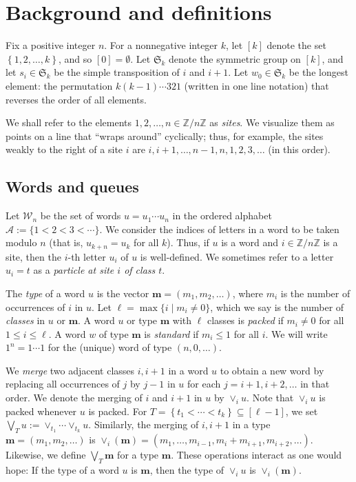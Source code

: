 \documentclass[reqno]{amsart}
\newcommand{\0}{\phantom{c}}
\newcommand{\merge}[1]{\vee_{#1}} %
\newcommand{\SymGp}[1]{\mathfrak{S}_{#1}} %
\newcommand{\mm}{\mathbf{m}}
\newcommand{\mcA}{\mathcal{A}}
\newcommand{\mcW}{\mathcal{W}}
\newcommand{\ZZ}{\mathbb{Z}}
\newcommand{\set}[1]{\left\{ #1 \right\}}
\newcommand{\ive}[1]{\left[ #1 \right]}
\newcommand{\defn}[1]{{\color{darkred}\emph{#1}}} %
\theoremstyle{plain}
\theoremstyle{definition}
\numberwithin{equation}{section}
\begin{document}
\section{Background and definitions}
\label{sec:background}

Fix a positive integer $n$.
For a nonnegative integer $k$, let $\ive{k}$ denote the set $\set{1, 2, \ldots, k}$, and so $[0] = \emptyset$.
Let $\SymGp{k}$ denote the symmetric group on $\ive{k}$, and let $s_i \in \SymGp{k}$ be the simple transposition of $i$ and $i+1$.
Let $w_0 \in \SymGp{k}$ be the longest element: the permutation $k (k-1) \dotsm 321$ (written in one line notation) that reverses the order of all elements.

We shall refer to the elements $1, 2, \ldots, n \in \ZZ / n \ZZ$ as \defn{sites}.
We visualize them as points on a line that ``wraps around'' cyclically; thus, for example, the sites weakly to the right of a site $i$ are $i, i+1, \ldots, n-1, n, 1, 2, 3, \ldots$ (in this order).

\subsection{Words and queues}

Let $\mcW_n$ be the set of words $u = u_1 \dotsm u_n$ in the ordered alphabet $\mcA := \{1 < 2 < 3 < \cdots \}$.
We consider the indices of letters in a word to be taken modulo $n$ (that is, $u_{k+n} = u_k$ for all $k$).
Thus, if $u$ is a word and $i \in \ZZ / n \ZZ$ is a site, then the $i$-th letter $u_i$ of $u$ is well-defined.
We sometimes refer to a letter $u_i = t$ as a \defn{particle at site $i$ of class $t$}.

The \defn{type} of a word $u$ is the vector $\mm = (m_1, m_2, \ldots)$, where $m_i$ is the number of occurrences of $i$ in $u$.
Let $\ell = \max\{i \mid m_i \neq 0 \}$, which we say is the number of \defn{classes} in $u$ or $\mm$.
A word $u$ or type $\mm$ with $\ell$ classes is \defn{packed} if $m_i \neq 0$ for all $1 \leq i \leq \ell$.
A word $w$ of type $\mm$ is \defn{standard} if $m_i \leq 1$ for all $i$.
We will write $1^n = 1 \dotsm 1$ for the (unique) word of type $(n, 0, \dotsc)$.

We \defn{merge} two adjacent classes $i,i+1$ in a word $u$ to obtain a new word by replacing all occurrences of $j$ by $j-1$ in $u$ for each $j = i+1, i+2, \ldots$ in that order.
We denote the merging of $i$ and $i+1$ in $u$ by $\merge{i} u$.
Note that $\merge{i} u$ is packed whenever $u$ is packed.
For $T = \set{t_1 < \cdots < t_k} \subseteq \ive{\ell-1}$, we set $\bigvee_T u := \merge{t_1} \cdots \merge{t_k} u$.
Similarly, the merging of $i,i+1$ in a type $\mm = (m_1, m_2, \ldots)$ is $\merge{i}(\mm) = (m_1, \dotsc, m_{i-1}, m_i + m_{i+1}, m_{i+2}, \ldots)$.
Likewise, we define $\bigvee_T \mm$ for a type $\mm$.
These operations interact as one would hope:
If the type of a word $u$ is $\mm$, then the type of $\merge{i} u$ is $\merge{i}(\mm)$.
\end{document}
